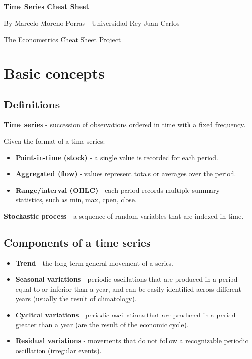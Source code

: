 \documentclass[10pt, a4paper, landscape]{article}
\begin{document}
\begin{multicols}{3}

\begin{center}
	\textbf{\LARGE \href{https://github.com/marcelomijas/econometrics-cheatsheet}{Time Series Cheat Sheet}}

	{\footnotesize By Marcelo Moreno Porras - Universidad Rey Juan Carlos}

	{\footnotesize The Econometrics Cheat Sheet Project}
\end{center}

\section*{Basic concepts}

\subsection*{Definitions}

\textbf{Time series} - succession of observations ordered in time with a fixed frequency.

Given the format of a time series:

\begin{itemize}[leftmargin=*]
	\item \textbf{Point-in-time (stock)} - a single value is recorded for each period.
	\item \textbf{Aggregated (flow)} - values represent totals or averages over the period.
	\item \textbf{Range/interval (OHLC)} - each period records multiple summary statistics, such as min, max, open, close.
\end{itemize}

\textbf{Stochastic process} - a sequence of random variables that are indexed in time.

\subsection*{Components of a time series}

\begin{itemize}[leftmargin=*]
	\item \textbf{Trend} - the long-term general movement of a series.
	\item \textbf{Seasonal variations} - periodic oscillations that are produced in a period equal to or inferior than a year, and can be easily identified across different years (usually the result of climatology).
	\item \textbf{Cyclical variations} - periodic oscillations that are produced in a period greater than a year (are the result of the economic cycle).
	\item \textbf{Residual variations} - movements that do not follow a recognizable periodic oscillation (irregular events).
\end{itemize}


\end{multicols}
\end{document}
